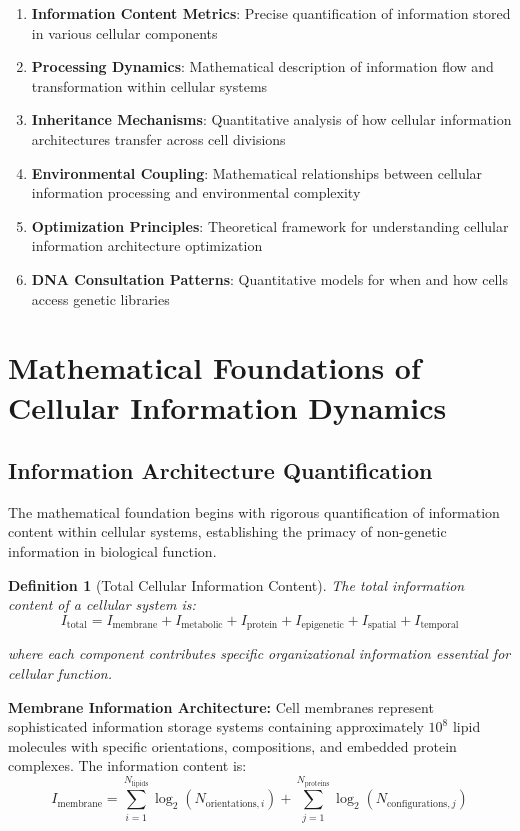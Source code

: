 \documentclass[12pt,a4paper]{article}
\newtheorem{definition}[theorem]{Definition}
\begin{document}
\begin{enumerate}
\item \textbf{Information Content Metrics}: Precise quantification of information stored in various cellular components
\item \textbf{Processing Dynamics}: Mathematical description of information flow and transformation within cellular systems
\item \textbf{Inheritance Mechanisms}: Quantitative analysis of how cellular information architectures transfer across cell divisions
\item \textbf{Environmental Coupling}: Mathematical relationships between cellular information processing and environmental complexity
\item \textbf{Optimization Principles}: Theoretical framework for understanding cellular information architecture optimization
\item \textbf{DNA Consultation Patterns}: Quantitative models for when and how cells access genetic libraries
\end{enumerate}

\section{Mathematical Foundations of Cellular Information Dynamics}

\subsection{Information Architecture Quantification}

The mathematical foundation begins with rigorous quantification of information content within cellular systems, establishing the primacy of non-genetic information in biological function.

\begin{definition}[Total Cellular Information Content]
The total information content of a cellular system is:
$$I_{\text{total}} = I_{\text{membrane}} + I_{\text{metabolic}} + I_{\text{protein}} + I_{\text{epigenetic}} + I_{\text{spatial}} + I_{\text{temporal}}$$

where each component contributes specific organizational information essential for cellular function.
\end{definition}

\textbf{Membrane Information Architecture:}
Cell membranes represent sophisticated information storage systems containing approximately $10^8$ lipid molecules with specific orientations, compositions, and embedded protein complexes. The information content is:
$$I_{\text{membrane}} = \sum_{i=1}^{N_{\text{lipids}}} \log_2(N_{\text{orientations},i}) + \sum_{j=1}^{N_{\text{proteins}}} \log_2(N_{\text{configurations},j})$$
\end{document}
